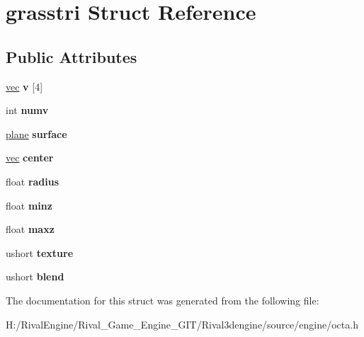 \hypertarget{structgrasstri}{}\section{grasstri Struct Reference}
\label{structgrasstri}
\subsection*{Public Attributes}
\begin{DoxyCompactItemize}
\item 
\mbox{\label{structgrasstri_ae0457b175f69eec31e17b6e814e47015}} 
\hyperlink{structvec}{vec} {\bfseries v} \mbox{[}4\mbox{]}
\item 
\mbox{\label{structgrasstri_a5a968f59815df8569c44beebd36613a9}} 
int {\bfseries numv}
\item 
\mbox{\label{structgrasstri_a0f756cd9807bdad475fcb67678c7b793}} 
\hyperlink{structplane}{plane} {\bfseries surface}
\item 
\mbox{\label{structgrasstri_a1e306f2317473684afb237c746cd2097}} 
\hyperlink{structvec}{vec} {\bfseries center}
\item 
\mbox{\label{structgrasstri_a3518c466c9b893d6f78ad31a9bc596ea}} 
float {\bfseries radius}
\item 
\mbox{\label{structgrasstri_a9e91c505776fd752705f2a46df2fa360}} 
float {\bfseries minz}
\item 
\mbox{\label{structgrasstri_a57f35c51395a9134433f8a92a41f4630}} 
float {\bfseries maxz}
\item 
\mbox{\label{structgrasstri_a1b0fef5fd27c75bada97a346564afbb6}} 
ushort {\bfseries texture}
\item 
\mbox{\label{structgrasstri_a5655eb1cc853126dcae8054d514fd0bd}} 
ushort {\bfseries blend}
\end{DoxyCompactItemize}


The documentation for this struct was generated from the following file\+:\begin{DoxyCompactItemize}
\item 
H\+:/\+Rival\+Engine/\+Rival\+\_\+\+Game\+\_\+\+Engine\+\_\+\+G\+I\+T/\+Rival3dengine/source/engine/octa.\+h\end{DoxyCompactItemize}
